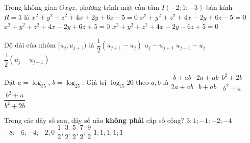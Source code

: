 \begin{ex}%
	Trong không gian $Oxyz$, phương trình mặt cầu tâm $I(-2;1;-3)$ bán kính $R=3$ là
	\choice
	{$x^2+y^2+z^2+4x+2y+6z-5=0$}
	{$x^2+y^2+z^2+4x-2y+6z-5=0$}
	{\True $x^2+y^2+z^2+4x-2y+6z+5=0$}
	{$x^2+y^2+z^2+4x-2y-6z+5=0$}
\end{ex}

\begin{ex}%
	Độ dài của nhóm $[u_j;u_{j+1})$ là
	\choice
	{$\dfrac{1}{2}(u_{j+1}-u_j)$}
	{$u_j-u_{j+1}$}
	{\True $u_{j+1}-u_j$}
	{$\dfrac{1}{2}(u_j-u_{j+1})$}
	\loigiai{
		Hiệu $u_{j+1}-u_j$ được gọi là độ dài của nhóm $[u_j;u_{j+1})$.
	}
\end{ex}

\begin{ex}%
	Đặt $a=\log _35$, $b=\log _25$. Giá trị $\log _{15}20$ theo $a,b$ là
	\choice
	{$\dfrac{b+ab}{2a+ab}$}
	{\True $\dfrac{2a+ab}{b+ab}$}
	{$\dfrac{b^2+2b}{b^2+a}$}
	{$\dfrac{b^2+a}{b^2+2b}$}
\end{ex}

\begin{ex}%
	Trong các dãy số sau, dãy số nào {\bf không phải} cấp số cộng?
	\choice
	{\True $3;1;-1;-2;-4$}
	{$-8;-6;-4;-2;0$}
	{$\dfrac{1}{2};\dfrac{3}{2};\dfrac{5}{2};\dfrac{7}{2};\dfrac{9}{2}$}
	{$1;1;1;1;1$}
\end{ex}

